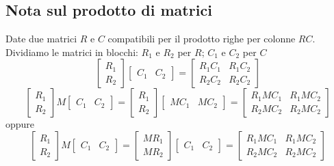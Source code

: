 \documentclass[../main.tex]{subfiles}
\begin{document}
	\subsection{Nota sul prodotto di matrici}
		Date due matrici $ R $ e $ C $ compatibili per il prodotto righe per colonne $ RC $. Dividiamo le matrici in blocchi: $ R_1 $ e $ R_2 $ per $ R $; $ C_1 $ e $ C_2 $ per $ C $
		\[
			\begin{bmatrix}
				R_1\\
				R_2
			\end{bmatrix}
			\begin{bmatrix}
				C_1 & C_2
			\end{bmatrix} =
			\begin{bmatrix}
				R_1 C_1 & R_1 C_2\\
				R_2 C_2 & R_2 C_2
			\end{bmatrix}
		\]
		\[
			\begin{bmatrix}
				R_1\\
				R_2
			\end{bmatrix} M
			\begin{bmatrix}
				C_1 & C_2
			\end{bmatrix} =
			\begin{bmatrix}
				R_1\\
				R_2
			\end{bmatrix}
			\begin{bmatrix}
				M C_1 & M C_2
			\end{bmatrix} =	
			\begin{bmatrix}
				R_1 M C_1 & R_1 M C_2\\
				R_2 M C_2 & R_2 M C_2
			\end{bmatrix}
		\]
		oppure
		\[
			\begin{bmatrix}
				R_1\\
				R_2
			\end{bmatrix} M
			\begin{bmatrix}
				C_1 & C_2
			\end{bmatrix} =
			\begin{bmatrix}
				M R_1\\
				M R_2
			\end{bmatrix}
			\begin{bmatrix}
				C_1 & C_2
			\end{bmatrix} =	
			\begin{bmatrix}
				R_1 M C_1 & R_1 M C_2\\
				R_2 M C_2 & R_2 M C_2
			\end{bmatrix}
		\]
		
\end{document}
